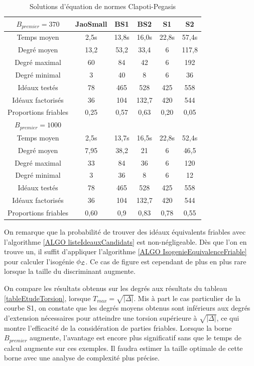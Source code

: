 \begin{table}[H]
	\begin{center}
		\begin{tabular}{|c|c|c|c|c|c|}
		\hline
		$B_{premier} = 370$	& JaoSmall & BS1 & BS2 & S1 & S2 \\
		\hline
		Temps moyen	& 2,5s & 13,8s & 16,0s & 22,8s & 57,4s \\
		\hline
		Degré moyen	& 13,2 & 53,2 & 33,4 & 6 & 117,8 \\
		\hline
		Degré maximal	& 60 & 84 & 42 & 6 & 192 \\
		\hline
		Degré minimal	& 3 & 40 & 8 & 6 & 36 \\
		\hline
		Idéaux testés	& 78 & 465 & 528 & 425 & 558 \\
		\hline
		Idéaux factorisés	& 36 & 104 & 132,7 & 420 & 544 \\
		\hline
		Proportions friables	& 0,25 & 0,57 & 0,63 & 0,20 & 0,05 \\
		\hline
		\hline
		$B_{premier} = 1000$	&  &  &  &  &  \\
		\hline
		Temps moyen	& 2,5s & 13,7s & 16,5s & 22,8s & 52,4s \\
		\hline
		Degré moyen	& 7,95 & 38,2 & 21 & 6 & 46,5 \\
		\hline
		Degré maximal	& 33 & 84 & 36 & 6 & 120 \\
		\hline
		Degré minimal	& 3 & 36 & 8 & 6 & 12 \\
		\hline
		Idéaux testés	& 78 & 465 & 528 & 425 & 558 \\
		\hline
		Idéaux factorisés	& 36 & 104 & 132,7 & 420 & 544 \\
		\hline
		Proportions friables & 0,60 & 0,9 & 0,83 & 0,78 & 0,55 \\
		\hline
		\end{tabular}
	\end{center}
	\caption{Solutions d'équation de normes Clapoti-Pegasis}
	\label{tableCalpotiPegasis}
\end{table}

On remarque que la probabilité de trouver des idéaux équivalents friables avec l'algorithme \ref{ALGO listeIdeauxCandidats} est non-négligeable. Dès que l'on en trouve un, il suffit d'appliquer l'algorithme \ref{ALGO IsogenieEquivalenceFriable} pour calculer l'isogénie $\phi_{\mathfrak{L}}$. Ce cas de figure est cependant de plus en plus rare lorsque la taille du discriminant augmente. 

On compare les résultats obtenus sur les degrés aux résultats du tableau \ref{tableEtudeTorsion}, lorsque $T_{max} = \sqrt{|\Delta|}$. Mis à part le cas particulier de la courbe S1, on constate que les degrés moyens obtenus sont inférieurs aux degrés d'extension nécessaires pour atteindre une torsion supérieure à $\sqrt{|\Delta|}$, ce qui montre l'efficacité de la considération de parties friables. Lorsque la borne $B_{premier}$ augmente, l'avantage est encore plus significatif sans que le temps de calcul augmente sur ces exemples. Il faudra estimer la taille optimale de cette borne avec une analyse de complexité plus précise. 



